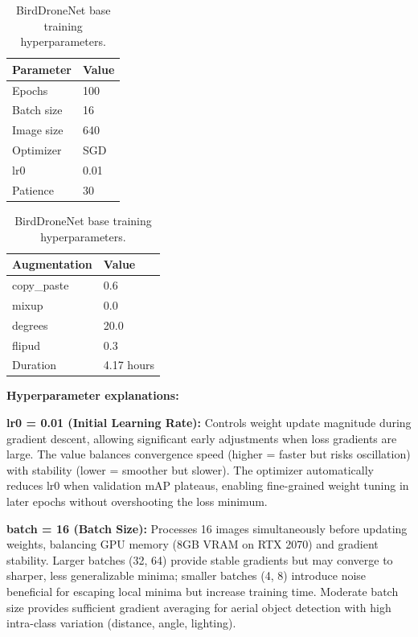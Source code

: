 \documentclass[12pt,a4paper]{report}
\renewcommand{\arraystretch}{1.1}
\begin{document}
\begin{table}[H]
\centering
\caption[Base training hyperparameters]{BirdDroneNet base training hyperparameters.}
\begin{minipage}[t]{0.48\textwidth}
\centering
\renewcommand{\arraystretch}{0.9}
\begin{tabular}{|l|l|}
\hline
\rowcolor{gray!20}
\textbf{Parameter} & \textbf{Value} \\
\hline
Epochs       & 100 \\
\hline
Batch size   & 16 \\
\hline
Image size   & 640 \\
\hline
Optimizer    & SGD \\
\hline
lr0          & 0.01 \\
\hline
Patience     & 30 \\
\hline
\end{tabular}
\end{minipage}
\hfill
\begin{minipage}[t]{0.48\textwidth}
\centering
\renewcommand{\arraystretch}{0.9}
\begin{tabular}{|l|l|}
\hline
\rowcolor{gray!20}
\textbf{Augmentation} & \textbf{Value} \\
\hline
copy\_paste  & 0.6 \\
\hline
mixup        & 0.0 \\
\hline
degrees      & 20.0 \\
\hline
flipud       & 0.3 \\
\hline
Duration     & 4.17 hours \\
\hline
\end{tabular}
\end{minipage}
\end{table}

\textbf{Hyperparameter explanations:}

\textbf{lr0 = 0.01 (Initial Learning Rate):}
Controls weight update magnitude during gradient descent, allowing significant early adjustments when loss gradients are large. The value balances convergence speed (higher = faster but risks oscillation) with stability (lower = smoother but slower). The optimizer automatically reduces lr0 when validation mAP plateaus, enabling fine-grained weight tuning in later epochs without overshooting the loss minimum.

\textbf{batch = 16 (Batch Size):}
Processes 16 images simultaneously before updating weights, balancing GPU memory (8GB VRAM on RTX 2070) and gradient stability. Larger batches (32, 64) provide stable gradients but may converge to sharper, less generalizable minima; smaller batches (4, 8) introduce noise beneficial for escaping local minima but increase training time. Moderate batch size provides sufficient gradient averaging for aerial object detection with high intra-class variation (distance, angle, lighting).
\end{document}
